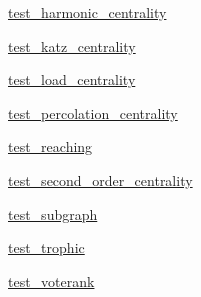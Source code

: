 \begin{DoxyCompactItemize}
\item 
 \hyperlink{namespacenetworkx_1_1algorithms_1_1centrality_1_1tests_1_1test__harmonic__centrality}{test\+\_\+harmonic\+\_\+centrality}
\item 
 \hyperlink{namespacenetworkx_1_1algorithms_1_1centrality_1_1tests_1_1test__katz__centrality}{test\+\_\+katz\+\_\+centrality}
\item 
 \hyperlink{namespacenetworkx_1_1algorithms_1_1centrality_1_1tests_1_1test__load__centrality}{test\+\_\+load\+\_\+centrality}
\item 
 \hyperlink{namespacenetworkx_1_1algorithms_1_1centrality_1_1tests_1_1test__percolation__centrality}{test\+\_\+percolation\+\_\+centrality}
\item 
 \hyperlink{namespacenetworkx_1_1algorithms_1_1centrality_1_1tests_1_1test__reaching}{test\+\_\+reaching}
\item 
 \hyperlink{namespacenetworkx_1_1algorithms_1_1centrality_1_1tests_1_1test__second__order__centrality}{test\+\_\+second\+\_\+order\+\_\+centrality}
\item 
 \hyperlink{namespacenetworkx_1_1algorithms_1_1centrality_1_1tests_1_1test__subgraph}{test\+\_\+subgraph}
\item 
 \hyperlink{namespacenetworkx_1_1algorithms_1_1centrality_1_1tests_1_1test__trophic}{test\+\_\+trophic}
\item 
 \hyperlink{namespacenetworkx_1_1algorithms_1_1centrality_1_1tests_1_1test__voterank}{test\+\_\+voterank}
\end{DoxyCompactItemize}

